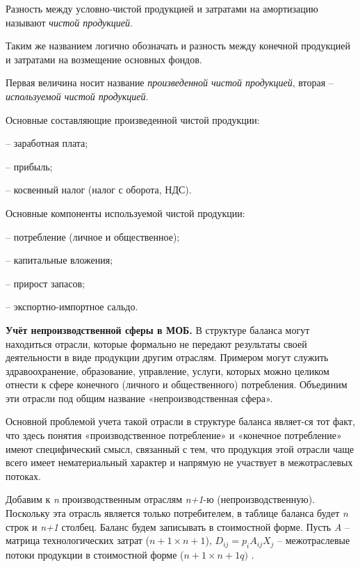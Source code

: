 \documentclass[12pt, 4paper]{book}
\begin{document}
{Разность между условно-чистой продукцией и затратами на амортизацию называют \textit{чистой продукцией}.
\par

Таким же названием логично обозначать и разность между конечной продукцией и затратами на возмещение основных фондов.
\par

Первая величина носит название \textit{произведенной чистой продукцией}, вторая – \textit{используемой чистой продукцией}.
\par

Основные составляющие произведенной чистой продукции:
\par

– заработная плата;
\par

– прибыль; 
\par

– косвенный налог (налог с оборота, НДС).
\par

Основные компоненты используемой чистой продукции:
\par

– потребление (личное и общественное); 
\par

– капитальные вложения;
\par
 
– прирост запасов;
\par

– экспортно-импортное сальдо.
\par

\textbf{Учёт непроизводственной сферы в МОБ.} В структуре баланса могут находиться отрасли, которые формально не передают результаты своей деятельности в виде продукции другим отраслям. Примером могут служить здравоохранение, образование, управление, услуги, которых можно целиком отнести к сфере конечного (личного и общественного) потребления. Объединим эти отрасли под общим название «непроизводственная сфера».
\par

Основной проблемой учета такой отрасли в структуре баланса являет-ся тот факт, что здесь понятия «производственное потребление» и «конечное потребление» имеют специфический смысл, связанный с тем, что продукция этой отрасли чаще всего имеет нематериальный характер и напрямую не участвует в межотраслевых потоках.
\par

Добавим к \textit{n} производственным отраслям \textit{n+1}-ю (непроизводственную). Поскольку эта отрасль является только потребителем, в таблице баланса будет \textit{n} строк и \textit{n+1} столбец. 
Баланс будем записывать в стоимостной форме. Пусть \textit{A} – матрица технологических затрат ($ {n+1} \times {n+1}$), $D_{ij} = p_i A_{ij} X_j$   – межотраслевые потоки продукции в стоимостной форме (${n+1} \times {n+1}q)$ .
\par

}
\end{document}
